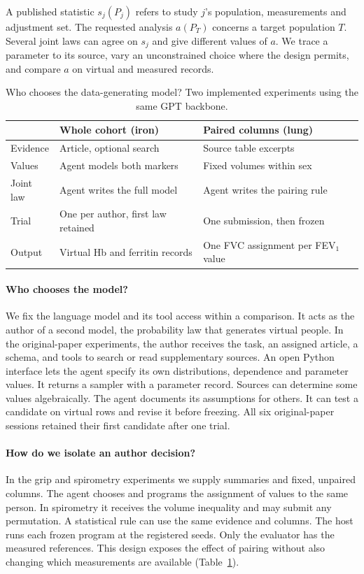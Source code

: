 \documentclass[sigconf,anonymous,review]{acmart}
\begin{document}
A published statistic $s_j(P_j)$ refers to study $j$'s population, measurements and adjustment set. The requested analysis $a(P_T)$ concerns a target population $T$. Several joint laws can agree on $s_j$ and give different values of $a$. We trace a parameter to its source, vary an unconstrained choice where the design permits, and compare $a$ on virtual and measured records.

\begin{table}[tbp]
\caption{Who chooses the data-generating model? Two implemented experiments using the same GPT backbone.}
\label{tab:authority}
\small\centering
\begin{tabular}{@{}>{\raggedright\arraybackslash}p{}>{\raggedright\arraybackslash}p{}>{\raggedright\arraybackslash}p{}@{}}
\toprule
 & Whole cohort (iron) & Paired columns (lung)\\
\midrule
Evidence & Article, optional search & Source table excerpts\\
Values & Agent models both markers & Fixed volumes within sex\\
Joint law & Agent writes the full model & Agent writes the pairing rule\\
Trial & One per author, first law retained & One submission, then frozen\\
Output & Virtual Hb and ferritin records & One FVC assignment per FEV$_1$ value\\
\bottomrule
\end{tabular}
\end{table}

\paragraph{Who chooses the model?}
We fix the language model and its tool access within a comparison. It acts as the author of a second model, the probability law that generates virtual people. In the original-paper experiments, the author receives the task, an assigned article, a schema, and tools to search or read supplementary sources. An open Python interface lets the agent specify its own distributions, dependence and parameter values. It returns a sampler with a parameter record. Sources can determine some values algebraically. The agent documents its assumptions for others. It can test a candidate on virtual rows and revise it before freezing. All six original-paper sessions retained their first candidate after one trial.

\paragraph{How do we isolate an author decision?}
In the grip and spirometry experiments we supply summaries and fixed, unpaired columns. The agent chooses and programs the assignment of values to the same person. In spirometry it receives the volume inequality and may submit any permutation. A statistical rule can use the same evidence and columns. The host runs each frozen program at the registered seeds. Only the evaluator has the measured references. This design exposes the effect of pairing without also changing which measurements are available (Table~\ref{tab:authority}).
\end{document}
